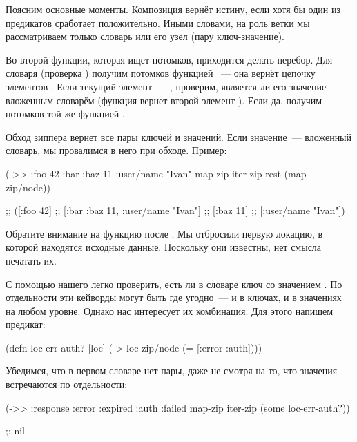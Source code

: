 Поясним основные моменты. Композиция  вернёт истину, если хотя бы
один из предикатов сработает положительно. Иными словами, на роль ветки мы
рассматриваем только словарь или его узел (пару ключ-значение).

Во второй функции, которая ищет потомков, приходится делать перебор. Для словаря
(проверка ) получим потомков функцией ~--- она вернёт цепочку
элементов . Если текущий элемент~--- , проверим, является ли
его значение вложенным словарём (функция  вернет второй элемент
). Если да, получим потомков той же функцией .

Обход зиппера вернет все пары ключей и значений. Если значение~--- вложенный
словарь, мы провалимся в него при обходе. Пример:

\begin{english}
  \begin{clojure}
(->> {:foo 42
      :bar {:baz 11
            :user/name "Ivan"}}
     map-zip
     iter-zip
     rest
     (map zip/node))

;; ([:foo 42]
;;  [:bar {:baz 11, :user/name "Ivan"}]
;;  [:baz 11]
;;  [:user/name "Ivan"])
  \end{clojure}
\end{english}

Обратите внимание на функцию  после . Мы отбросили первую
локацию, в которой находятся исходные данные. Поскольку они известны, нет смысла
печатать их.

С помощью нашего  легко проверить, есть ли в словаре ключ  со
значением . По отдельности эти кейворды могут быть где угодно~--- и в
ключах, и в значениях на любом уровне. Однако нас интересует их комбинация. Для
этого напишем предикат:

\begin{english}
  \begin{clojure}
(defn loc-err-auth? [loc]
  (-> loc zip/node (= [:error :auth])))
  \end{clojure}
\end{english}

Убедимся, что в первом словаре нет пары, даже не смотря на то, что значения
встречаются по отдельности:

\begin{english}
  \begin{clojure}
(->> {:response {:error :expired
                 :auth :failed}}
     map-zip
     iter-zip
     (some loc-err-auth?))

;; nil
  \end{clojure}
\end{english}

